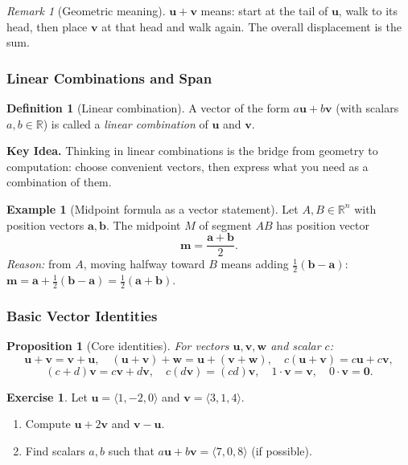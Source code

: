 \documentclass[12pt]{article}
\numberwithin{equation}{section}
\newcommand{\RR}{\mathbb{R}}
\newcommand{\vect}[1]{\boldsymbol{#1}}   %
\theoremstyle{plain}
\newtheorem{proposition}[theorem]{Proposition}
\theoremstyle{definition}
\newtheorem{definition}[theorem]{Definition}
\newtheorem{example}[theorem]{Example}
\newtheorem{exercise}[theorem]{Exercise}
\theoremstyle{remark}
\newtheorem{remark}[theorem]{Remark}
\newenvironment{keyidea}{\begin{tcolorbox}\textbf{Key Idea.}}{\end{tcolorbox}}
\begin{document}
\begin{remark}[Geometric meaning]
$\vect{u}+\vect{v}$ means: start at the tail of $\vect{u}$, walk to its head, then place $\vect{v}$ at that head and walk again. The overall displacement is the sum.
\end{remark}

\subsubsection{Linear Combinations and Span}

\begin{definition}[Linear combination]
A vector of the form $a\vect{u}+b\vect{v}$ (with scalars $a,b\in\RR$) is called a \emph{linear combination} of $\vect{u}$ and $\vect{v}$.
\end{definition}

\begin{keyidea}
Thinking in linear combinations is the bridge from geometry to computation: choose convenient vectors, then express what you need as a combination of them.
\end{keyidea}

\begin{example}[Midpoint formula as a vector statement]
Let $A,B\in\RR^n$ with position vectors $\vect{a},\vect{b}$. The midpoint $M$ of segment $AB$ has position vector
\[
\vect{m}=\frac{\vect{a}+\vect{b}}{2}.
\]
\emph{Reason:} from $A$, moving halfway toward $B$ means adding $\tfrac12(\vect{b}-\vect{a})$:
$\vect{m}=\vect{a}+\tfrac12(\vect{b}-\vect{a})=\tfrac12(\vect{a}+\vect{b})$.
\end{example}

\subsubsection{Basic Vector Identities}

\begin{proposition}[Core identities]
For vectors $\vect{u},\vect{v},\vect{w}$ and scalar $c$:
\[
\vect{u}+\vect{v}=\vect{v}+\vect{u},\quad
(\vect{u}+\vect{v})+\vect{w}=\vect{u}+(\vect{v}+\vect{w}),\quad
c(\vect{u}+\vect{v})=c\vect{u}+c\vect{v},
\]
\[
(c+d)\vect{v}=c\vect{v}+d\vect{v},\quad
c(d\vect{v})=(cd)\vect{v},\quad
1\cdot\vect{v}=\vect{v},\quad
0\cdot\vect{v}=\vect{0}.
\]
\end{proposition}

\begin{exercise}
Let $\vect{u}=\langle 1,-2,0\rangle$ and $\vect{v}=\langle 3,1,4\rangle$.
\begin{enumerate}[label=(\alph*)]
\item Compute $\vect{u}+2\vect{v}$ and $\vect{v}-\vect{u}$.
\item Find scalars $a,b$ such that $a\vect{u}+b\vect{v}=\langle 7,0,8\rangle$ (if possible).
\end{enumerate}
\end{exercise}
\end{document}

